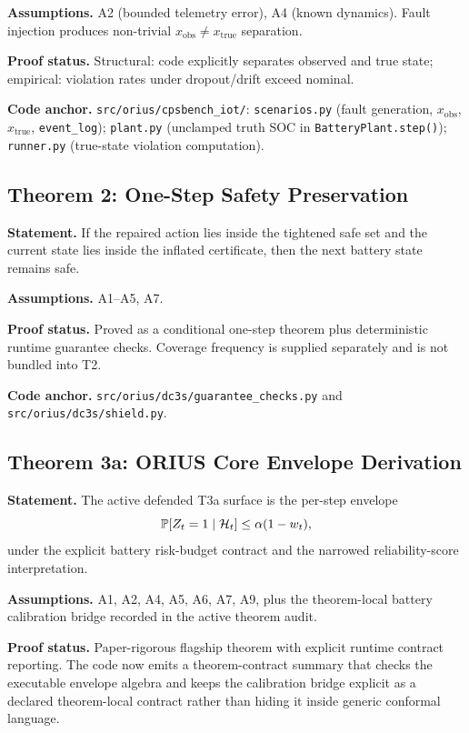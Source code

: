 \textbf{Assumptions.} A2 (bounded telemetry error), A4 (known dynamics). Fault injection produces non-trivial $x_{\text{obs}} \neq x_{\text{true}}$ separation.

\textbf{Proof status.} Structural: code explicitly separates observed and true state; empirical: violation rates under dropout/drift exceed nominal.

\textbf{Code anchor.} \texttt{src/orius/cpsbench\_iot/}: \texttt{scenarios.py} (fault generation, $x_{\text{obs}}$, $x_{\text{true}}$, \texttt{event\_log}); \texttt{plant.py} (unclamped truth SOC in \texttt{BatteryPlant.step()}); \texttt{runner.py} (true-state violation computation).

\subsection{Theorem 2: One-Step Safety Preservation}
\label{sec:thm-safety-preservation}

\textbf{Statement.} If the repaired action lies inside the tightened safe set
and the current state lies inside the inflated certificate, then the next
battery state remains safe.

\textbf{Assumptions.} A1--A5, A7.

\textbf{Proof status.} Proved as a conditional one-step theorem plus
deterministic runtime guarantee checks.  Coverage frequency is supplied
separately and is not bundled into T2.

\textbf{Code anchor.} \texttt{src/orius/dc3s/guarantee\_checks.py} and
\texttt{src/orius/dc3s/shield.py}.

\subsection{Theorem 3a: ORIUS Core Envelope Derivation}
\label{sec:thm-core-bound}

\textbf{Statement.} The active defended T3a surface is the per-step envelope
\[
  \operatorname{\mathbb{P}}[Z_t = 1 \mid \mathcal{H}_t] \le \alpha(1-w_t),
\]
under the explicit battery risk-budget contract and the narrowed
reliability-score interpretation.

\textbf{Assumptions.} A1, A2, A4, A5, A6, A7, A9, plus the theorem-local
battery calibration bridge recorded in the active theorem audit.

\textbf{Proof status.} Paper-rigorous flagship theorem with explicit runtime
contract reporting.  The code now emits a theorem-contract summary that checks
the executable envelope algebra and keeps the calibration bridge explicit as a
declared theorem-local contract rather than hiding it inside generic conformal
language.

